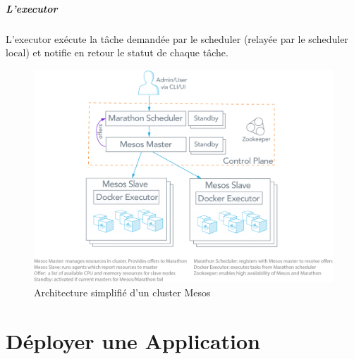 \documentclass[11pt,fleqn]{book} %
\begin{document}
\paragraph*{L'executor}
L'executor exécute la tâche demandée par le scheduler (relayée par le scheduler local) et notifie en retour le statut de chaque tâche.


\begin{figure}[H]\centering
\renewcommand{\figurename}{Schéma}
\includegraphics[scale=0.35,trim={0 5cm 0 0},clip]{Pictures/Comparaison/mesos-architecture.png}
\captionsetup{margin=1.5cm,format=hang,justification=justified}
\caption[]{Architecture simplifié d'un cluster Mesos \newline}
\end{figure}



\chapter{Déployer une Application}
\label{A}
\vspace{-2cm}
\end{document}
